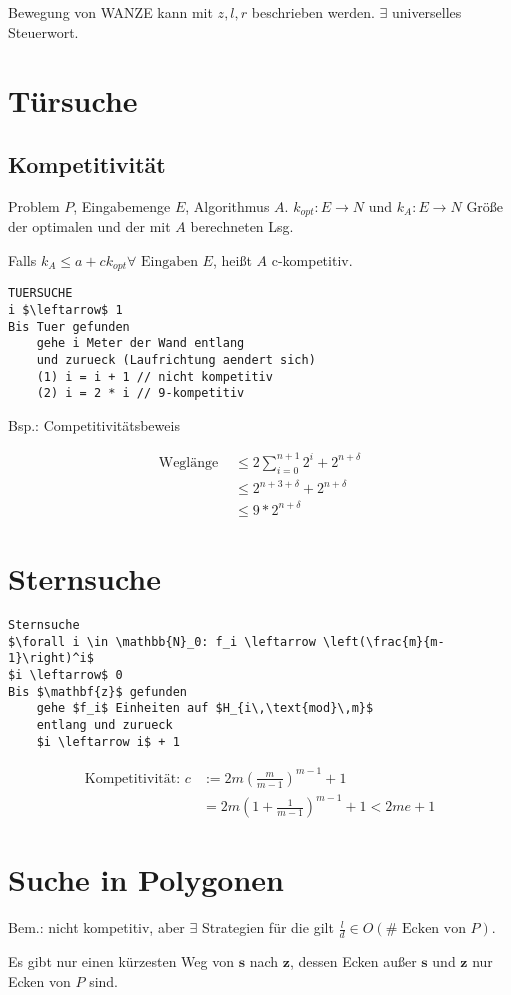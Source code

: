 \documentclass[8pt, DIV15, twocolumn]{scrartcl}
\begin{document}
Bewegung von WANZE kann mit $z,l,r$ beschrieben werden. $\exists$ universelles Steuerwort.

\section*{Türsuche}
\subsection*{Kompetitivität}
Problem $P$, Eingabemenge $E$, Algorithmus $A$. $k_{opt}: E \rightarrow N \text{ und } k_A: E \rightarrow N$ Größe der optimalen und der mit $A$ berechneten Lsg. 

Falls $k_A \leq a + c k_{opt} \forall \text{ Eingaben } E$, heißt $A$ c-kompetitiv.

\begin{lstlisting}[mathescape=true]
TUERSUCHE
i $\leftarrow$ 1
Bis Tuer gefunden
	gehe i Meter der Wand entlang
	und zurueck (Laufrichtung aendert sich)
	(1) i = i + 1 // nicht kompetitiv
	(2) i = 2 * i // 9-kompetitiv
\end{lstlisting}


Bsp.: Competitivitätsbeweis

\begin{equation*}
\begin{aligned}
\text{Weglänge } &\leq 2 \sum\limits_{i=0}^{n+1} 2^i + 2^{n+\delta} \\
&\leq 2^{n+3+\delta} + 2^{n+\delta} \\
&\leq 9 * 2^{n+\delta}
\end{aligned}
\end{equation*}

\section*{Sternsuche}

\begin{lstlisting}[mathescape=true]
Sternsuche
$\forall i \in \mathbb{N}_0: f_i \leftarrow \left(\frac{m}{m-1}\right)^i$
$i \leftarrow$ 0
Bis $\mathbf{z}$ gefunden
	gehe $f_i$ Einheiten auf $H_{i\,\text{mod}\,m}$
	entlang und zurueck
	$i \leftarrow i$ + 1
\end{lstlisting}

\begin{equation*}
\begin{aligned}
\text{Kompetitivität: } c &:= 2m\left(\frac{m}{m-1}\right)^{m-1} + 1 \\
&= 2m \left(1 + \frac{1}{m-1}\right)^{m-1} + 1 < 2me + 1
\end{aligned}
\end{equation*}

\section*{Suche in Polygonen}

Bem.: nicht kompetitiv, aber $\exists$ Strategien für die gilt $\frac{l}{d} \in O\left(\#\text{ Ecken von }P\right)$.

Es gibt nur einen kürzesten Weg von $\mathbf{s}$ nach $\mathbf{z}$, dessen Ecken außer $\mathbf{s}$ und $\mathbf{z}$ nur Ecken von $P$ sind.
\end{document}
